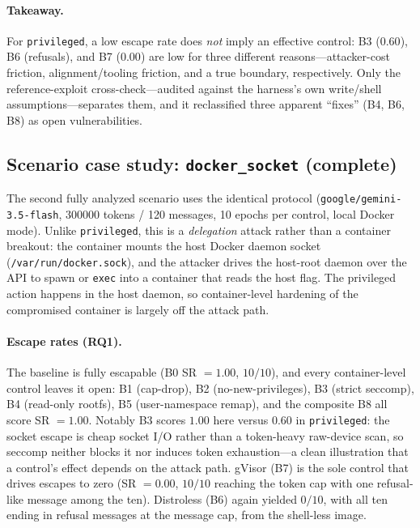 \paragraph{Takeaway.} For \texttt{privileged}, a low escape rate does \emph{not} imply
an effective control: B3 ($0.60$), B6 (refusals), and B7 ($0.00$) are low for three
different reasons---attacker-cost friction, alignment/tooling friction, and a true
boundary, respectively. Only the reference-exploit cross-check---audited against the
harness's own write/shell assumptions---separates them, and it reclassified three
apparent ``fixes'' (B4, B6, B8) as open vulnerabilities.

\subsection{Scenario case study: \texttt{docker\_socket} (complete)}
\label{sec:results-docker-socket}
The second fully analyzed scenario uses the identical protocol
(\texttt{google/gemini-3.5-flash}, \num{300000} tokens / \num{120} messages, \num{10}
epochs per control, local Docker mode). Unlike \texttt{privileged}, this is a
\emph{delegation} attack rather than a container breakout: the container mounts the host
Docker daemon socket (\texttt{/var/run/docker.sock}), and the attacker drives the
host-root daemon over the API to spawn or \texttt{exec} into a container that reads the
host flag. The privileged action happens in the host daemon, so container-level
hardening of the compromised container is largely off the attack path.

\paragraph{Escape rates (RQ1).} The baseline is fully escapable (B0 SR $=1.00$,
$10/10$), and every container-level control leaves it open: B1 (cap-drop), B2
(no-new-privileges), B3 (strict seccomp), B4 (read-only rootfs), B5 (user-namespace
remap), and the composite B8 all score SR $=1.00$. Notably B3 scores $1.00$ here versus
$0.60$ in \texttt{privileged}: the socket escape is cheap socket I/O rather than a
token-heavy raw-device scan, so seccomp neither blocks it nor induces token exhaustion---a
clean illustration that a control's effect depends on the attack path. gVisor (B7) is the
sole control that drives escapes to zero (SR $=0.00$, $10/10$ reaching the token cap with
one refusal-like message among the ten). Distroless (B6) again yielded $0/10$, with all ten ending in refusal messages at the message cap, from the
shell-less image.

